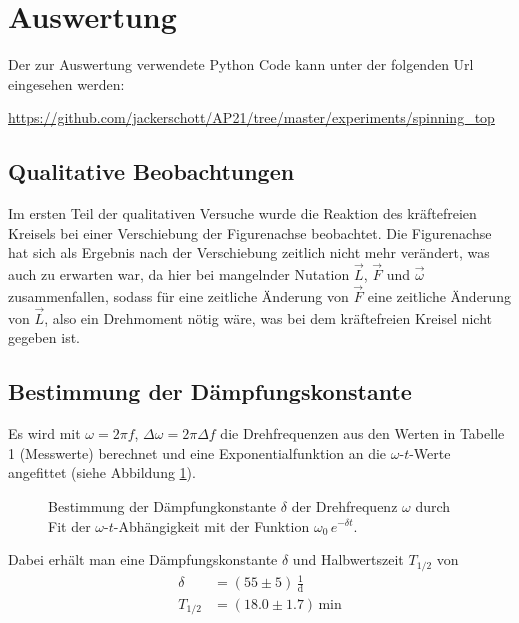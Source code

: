\documentclass[12pt,a4paper,german]{scrartcl}
\numberwithin{equation}{section}
\begin{document}
  \section{Auswertung}
  Der zur Auswertung verwendete Python Code kann unter der folgenden Url eingesehen werden:
  \begin{center}
    \href{https://github.com/jackerschott/AP21/tree/master/experiments/spinning_top}{https://github.com/jackerschott/AP21/tree/master/experiments/spinning\_top}
  \end{center}
  
  \subsection{Qualitative Beobachtungen}
  Im ersten Teil der qualitativen Versuche wurde die Reaktion des kräftefreien Kreisels bei einer Verschiebung der Figurenachse beobachtet.
  Die Figurenachse hat sich als Ergebnis nach der Verschiebung zeitlich nicht mehr verändert, was auch zu erwarten war, da hier bei mangelnder Nutation $\vec{L}$, $\vec{F}$ und $\vec{\omega}$ zusammenfallen, sodass für eine zeitliche Änderung von $\vec{F}$ eine zeitliche Änderung von $\vec{L}$, also ein Drehmoment nötig wäre, was bei dem kräftefreien Kreisel nicht gegeben ist.

  \subsection{Bestimmung der Dämpfungskonstante}
  Es wird mit $\omega = 2 \pi f$, $\Delta \omega = 2 \pi \Delta f$ die Drehfrequenzen aus den Werten in Tabelle 1 (Messwerte) berechnet und eine Exponentialfunktion an die $\omega$-$t$-Werte angefittet (siehe Abbildung \ref{fig_damping_constant}).

  \begin{figure}[H]
    \centering
    
    \caption{Bestimmung der Dämpfungkonstante $\delta$ der Drehfrequenz $\omega$ durch Fit der $\omega$-$t$-Abhängigkeit mit der Funktion $\omega_0 \, e^{-\delta t}$.}
    \label{fig_damping_constant}
  \end{figure}

  Dabei erhält man eine Dämpfungskonstante $\delta$ und Halbwertszeit $T_{1/2}$ von
  \begin{align}
    \delta &= (55 \pm 5) \, \frac{1}{\text{d}} \nonumber \\
    T_{1/2} &= (18.0 \pm 1.7) \, \text{min}
  \end{align}
\end{document}
